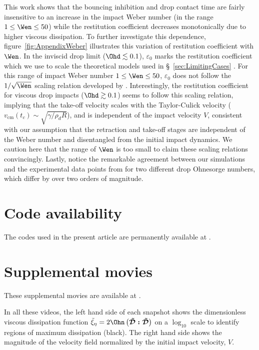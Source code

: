 \begin{subappendices}
	This work shows that the bouncing inhibition and drop contact time are fairly insensitive to an increase in the impact Weber number (in the range $1 \le \Wen \le 50$) while the restitution coefficient decreases monotonically due to higher viscous dissipation. To further investigate this dependence, figure~\ref{fig:AppendixWeber} illustrates this variation of restitution coefficient with $\Wen$. In the inviscid drop limit ($\Ohd \lesssim 0.1$), $\varepsilon_0$ marks the restitution coefficient which we use to scale the theoretical models used in \S~\ref{sec:LimitingCases} \citep[also see][]{biance2006, jha2020viscous}. For this range of impact Weber number $1 \le \Wen \le 50$, $\varepsilon_0$ does not follow the $1/\sqrt{\Wen}$ scaling relation developed by \citet{biance2006}. Interestingly, the restitution coefficient for viscous drop impacts ($\Ohd \gtrsim 0.1$) seems to follow this scaling relation, implying that the take-off velocity scales with the Taylor-Culick velocity ($v_{\text{cm}}(t_c) \sim \sqrt{\gamma/\rho_dR}$), and is independent of the impact velocity $V$, consistent with our assumption that the retraction and take-off stages are independent of the Weber number and disentangled from the initial impact dynamics. We caution here that the range of $\Wen$ is too small to claim these scaling relations convincingly. Lastly, notice the remarkable agreement between our simulations and the experimental data points from \citet{jha2020viscous} for two different drop Ohnesorge numbers, which differ by over two orders of magnitude.
	
	\section{Code availability}
	The codes used in the present article are permanently available at \citet{basiliskVatsalViscousBouncing}.
	
	\section{Supplemental movies}
	These supplemental movies are available at \citet[\href{https://youtube.com/playlist?list=PLf5C5HCrvhLHG5t3iPscUuEp_gbD4XHyU}{external YouTube link,}][]{vatsalViscDropsuppl}. 
	
	In all these videos, the left hand side of each snapshot shows the dimensionless viscous dissipation function $\tilde{\xi}_\eta = 2\Ohn\left(\boldsymbol{\tilde{\mathcal{D}}:\tilde{\mathcal{D}}}\right)$ on a $\log_{10}$ scale to identify regions of maximum dissipation (black). The right hand side shows the magnitude of the velocity field normalized by the initial impact velocity, $V$. 
	

\end{subappendices}
